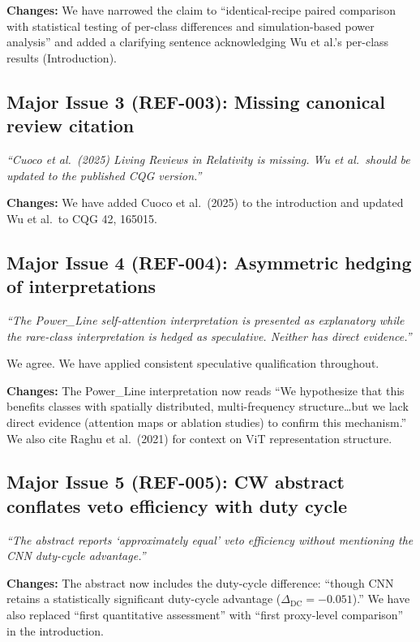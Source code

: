 \documentclass[12pt]{article}
\begin{document}
\textbf{Changes:} We have narrowed the claim to ``identical-recipe paired comparison with statistical testing of per-class differences and simulation-based power analysis'' and added a clarifying sentence acknowledging Wu et al.'s per-class results (Introduction).

\subsection*{Major Issue 3 (REF-003): Missing canonical review citation}

\textit{``Cuoco et al.\ (2025) Living Reviews in Relativity is missing. Wu et al.\ should be updated to the published CQG version.''}

\medskip

\textbf{Changes:} We have added Cuoco et al.\ (2025) to the introduction and updated Wu et al.\ to CQG 42, 165015.

\subsection*{Major Issue 4 (REF-004): Asymmetric hedging of interpretations}

\textit{``The Power\_Line self-attention interpretation is presented as explanatory while the rare-class interpretation is hedged as speculative. Neither has direct evidence.''}

\medskip

We agree. We have applied consistent speculative qualification throughout.

\textbf{Changes:} The Power\_Line interpretation now reads ``We hypothesize that this benefits classes with spatially distributed, multi-frequency structure\ldots but we lack direct evidence (attention maps or ablation studies) to confirm this mechanism.'' We also cite Raghu et al.\ (2021) for context on ViT representation structure.

\subsection*{Major Issue 5 (REF-005): CW abstract conflates veto efficiency with duty cycle}

\textit{``The abstract reports `approximately equal' veto efficiency without mentioning the CNN duty-cycle advantage.''}

\medskip

\textbf{Changes:} The abstract now includes the duty-cycle difference: ``though CNN retains a statistically significant duty-cycle advantage ($\Delta_\mathrm{DC} = -0.051$).'' We have also replaced ``first quantitative assessment'' with ``first proxy-level comparison'' in the introduction.
\end{document}
